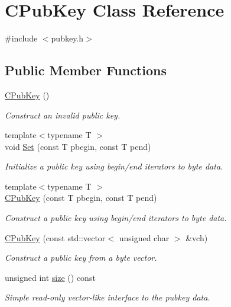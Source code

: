 \hypertarget{class_c_pub_key}{}\section{C\+Pub\+Key Class Reference}
\label{class_c_pub_key}


{\ttfamily \#include $<$pubkey.\+h$>$}

\subsection*{Public Member Functions}
\begin{DoxyCompactItemize}
\item 
\hyperlink{class_c_pub_key_a468f3aef3555d12ede19c0d8dc88c13a}{C\+Pub\+Key} ()
\begin{DoxyCompactList}\small\item\em Construct an invalid public key. \end{DoxyCompactList}\item 
{\footnotesize template$<$typename T $>$ }\\void \hyperlink{class_c_pub_key_af59bc1d3be119c1f8b49d3c1e2c0797b}{Set} (const T pbegin, const T pend)
\begin{DoxyCompactList}\small\item\em Initialize a public key using begin/end iterators to byte data. \end{DoxyCompactList}\item 
{\footnotesize template$<$typename T $>$ }\\\hyperlink{class_c_pub_key_a8c7527b40c96bfb8f48b669764301df8}{C\+Pub\+Key} (const T pbegin, const T pend)
\begin{DoxyCompactList}\small\item\em Construct a public key using begin/end iterators to byte data. \end{DoxyCompactList}\item 
\hyperlink{class_c_pub_key_a31307d0318ebda95c7e34ef1554fe2d2}{C\+Pub\+Key} (const std\+::vector$<$ unsigned char $>$ \&vch)
\begin{DoxyCompactList}\small\item\em Construct a public key from a byte vector. \end{DoxyCompactList}\item 
unsigned int \hyperlink{class_c_pub_key_a9d7129b65b6dee792b4f3923cd64ed59}{size} () const 
\begin{DoxyCompactList}\small\item\em Simple read-\/only vector-\/like interface to the pubkey data. \end{DoxyCompactList}\item 

\end{DoxyCompactItemize}
